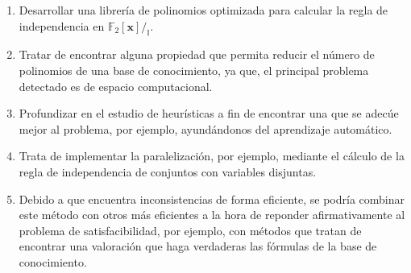\begin{enumerate}
\item Desarrollar una librería de polinomios optimizada para calcular la regla de independencia en $\mathbb{F}_2[\textbf{x}]/_{\mathbb{I}}$.
\item Tratar de encontrar alguna propiedad que permita reducir el número de polinomios de una base de conocimiento, ya que, el principal problema detectado es de espacio computacional.
\item Profundizar en el estudio de heurísticas a fin de encontrar una que se adecúe mejor al problema, por ejemplo, ayundándonos del aprendizaje automático.
\item Trata de implementar la paralelización, por ejemplo, mediante el cálculo de la regla de independencia de conjuntos con variables disjuntas. 
\item Debido a que encuentra inconsistencias de forma eficiente, se podría combinar este método con otros más eficientes a la hora de reponder afirmativamente al problema de satisfacibilidad, por ejemplo, con métodos que tratan de encontrar una valoración que haga verdaderas las fórmulas de la base de conocimiento.
\end{enumerate}